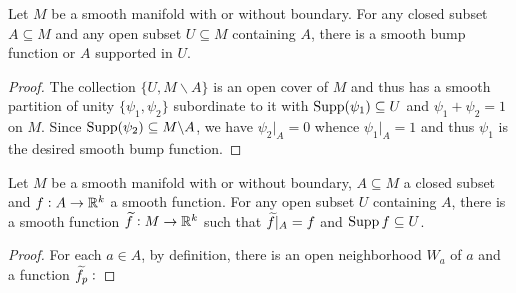 \begin{proposition}
    Let $M$ be a smooth manifold with or without boundary. For any closed subset $A\subseteq M$ and any open subset $U\subseteq M$ containing $A$, there is a smooth bump function or $A$ supported in $U$.
\end{proposition}
\begin{proof}
    The collection $\{U,M\backslash A\}$ is an open cover of $M$ and thus has a smooth partition of unity $\{\psi_1,\psi_2\}$ subordinate to it with $\operatorname{Supp}(\psi_1)\subseteq U$ and $\psi_1 + \psi_2 = 1$ on $M$. Since $\operatorname{Supp}(\psi_2)\subseteq M\backslash A$, we have $\psi_2|_A = 0$ whence $\psi_1|_A = 1$ and thus $\psi_1$ is the desired smooth bump function.
\end{proof}

\begin{lemma}
    Let $M$ be a smooth manifold with or without boundary, $A\subseteq M$ a closed subset and $f: A\to\mathbb{R}^k$ a smooth function. For any open subset $U$ containing $A$, there is a smooth function $\widetilde{f}: M\to\mathbb{R}^k$ such that $\widetilde{f}|_A = f$ and $\operatorname{Supp} f \subseteq U$.
\end{lemma}
\begin{proof}
    For each $a\in A$, by definition, there is an open neighborhood $W_a$ of $a$ and a function $\widetilde{f}_p: $
\end{proof}